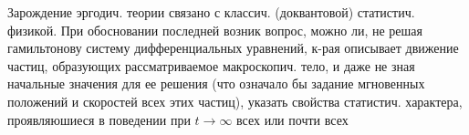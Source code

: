 \documentclass[10pt]{article}
\begin{document}
Зарождение эргодич. теории связано с классич. (доквантовой) статистич. физикой. При обосновании последней возник вопрос, можно ли, не решая гамильтонову систему дифференциальных уравнений, к-рая описывает движение частиц, образующих рассматриваемое макроскопич. тело, и даже не зная начальные значения для ее решения (что означало бы задание мгновенных положений и скоростей всех этих частиц), указать свойства статистич. характера, проявляюшиеся в поведении при $t \rightarrow \infty$ всех или почти всех
\end{document}
